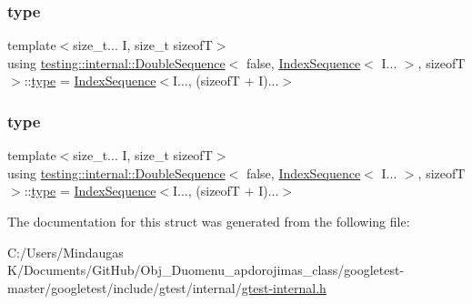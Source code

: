 \subsubsection{\texorpdfstring{type}{type}\hspace{0.1cm}{\footnotesize\ttfamily [1/2]}}
{\footnotesize\ttfamily template$<$size\+\_\+t... I, size\+\_\+t sizeofT$>$ \\
using \mbox{\hyperlink{structtesting_1_1internal_1_1_double_sequence}{testing\+::internal\+::\+Double\+Sequence}}$<$ false, \mbox{\hyperlink{structtesting_1_1internal_1_1_index_sequence}{Index\+Sequence}}$<$ I... $>$, sizeofT $>$\+::\mbox{\hyperlink{structtesting_1_1internal_1_1_double_sequence_3_01false_00_01_index_sequence_3_01_i_8_8_8_01_4_00_01sizeof_t_01_4_af11568320fe19e984e2eb5ab9ad026aa}{type}} =  \mbox{\hyperlink{structtesting_1_1internal_1_1_index_sequence}{Index\+Sequence}}$<$I..., (sizeofT + I)...$>$}

\mbox{\label{structtesting_1_1internal_1_1_double_sequence_3_01false_00_01_index_sequence_3_01_i_8_8_8_01_4_00_01sizeof_t_01_4_af11568320fe19e984e2eb5ab9ad026aa}} 
\subsubsection{\texorpdfstring{type}{type}\hspace{0.1cm}{\footnotesize\ttfamily [2/2]}}
{\footnotesize\ttfamily template$<$size\+\_\+t... I, size\+\_\+t sizeofT$>$ \\
using \mbox{\hyperlink{structtesting_1_1internal_1_1_double_sequence}{testing\+::internal\+::\+Double\+Sequence}}$<$ false, \mbox{\hyperlink{structtesting_1_1internal_1_1_index_sequence}{Index\+Sequence}}$<$ I... $>$, sizeofT $>$\+::\mbox{\hyperlink{structtesting_1_1internal_1_1_double_sequence_3_01false_00_01_index_sequence_3_01_i_8_8_8_01_4_00_01sizeof_t_01_4_af11568320fe19e984e2eb5ab9ad026aa}{type}} =  \mbox{\hyperlink{structtesting_1_1internal_1_1_index_sequence}{Index\+Sequence}}$<$I..., (sizeofT + I)...$>$}



The documentation for this struct was generated from the following file\+:\begin{DoxyCompactItemize}
\item 
C\+:/\+Users/\+Mindaugas K/\+Documents/\+Git\+Hub/\+Obj\+\_\+\+Duomenu\+\_\+apdorojimas\+\_\+class/googletest-\/master/googletest/include/gtest/internal/\mbox{\hyperlink{googletest-master_2googletest_2include_2gtest_2internal_2gtest-internal_8h}{gtest-\/internal.\+h}}\end{DoxyCompactItemize}
